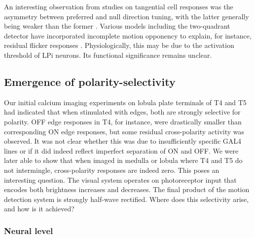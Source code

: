 An interesting observation from studies on tangential cell responses was the asymmetry between preferred and null direction tuning, with the latter generally being weaker than the former \citep{Egelhaaf:1989wf,Joesch:2008fo}. Various models including the two-quadrant detector have incorporated incomplete motion opponency to explain, for instance, residual flicker responses \citep{Eichner:2011ic}. Physiologically, this may be due to the activation threshold of LPi neurons. Its functional significance remains unclear.


\subsection{Emergence of polarity-selectivity}
Our initial calcium imaging experiments on lobula plate terminals of T4 and T5 had indicated that when stimulated with edges, both are strongly selective for polarity. OFF edge responses in T4, for instance, were drastically smaller than corresponding ON edge responses, but some residual cross-polarity activity was observed. It was not clear whether this was due to insufficiently specific GAL4 lines or if it did indeed reflect imperfect separation of ON and OFF. We were later able to show that when imaged in medulla or lobula where T4 and T5 do not intermingle, cross-polarity responses are indeed zero. This poses an interesting question. The visual system operates on photoreceptor input that encodes both brightness increases and decreases. The final product of the motion detection system is strongly half-wave rectified. Where does this selectivity arise, and how is it achieved?

\subsubsection{Neural level}


